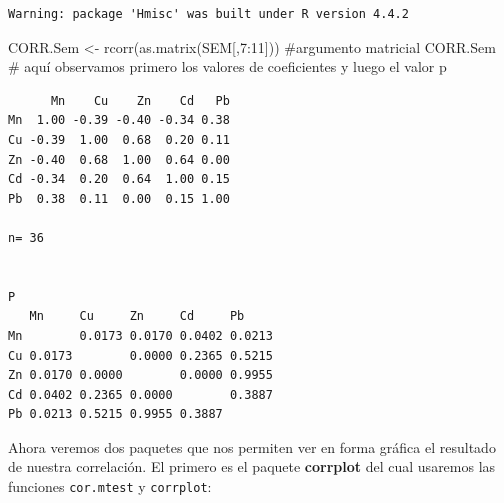 \documentclass[
  letterpaper,
  DIV=11,
  numbers=noendperiod]{scrartcl}
\newenvironment{Shaded}{\begin{snugshade}}{\end{snugshade}}
\newcommand{\AttributeTok}[1]{\textcolor[rgb]{0.40,0.45,0.13}{#1}}
\newcommand{\CommentTok}[1]{\textcolor[rgb]{0.37,0.37,0.37}{#1}}
\newcommand{\DecValTok}[1]{\textcolor[rgb]{0.68,0.00,0.00}{#1}}
\newcommand{\FloatTok}[1]{\textcolor[rgb]{0.68,0.00,0.00}{#1}}
\newcommand{\FunctionTok}[1]{\textcolor[rgb]{0.28,0.35,0.67}{#1}}
\newcommand{\NormalTok}[1]{\textcolor[rgb]{0.00,0.23,0.31}{#1}}
\newcommand{\OtherTok}[1]{\textcolor[rgb]{0.00,0.23,0.31}{#1}}
\newcommand{\SpecialCharTok}[1]{\textcolor[rgb]{0.37,0.37,0.37}{#1}}
\newcommand{\StringTok}[1]{\textcolor[rgb]{0.13,0.47,0.30}{#1}}
\begin{document}
\begin{verbatim}
Warning: package 'Hmisc' was built under R version 4.4.2
\end{verbatim}

\begin{Shaded}
\begin{Highlighting}[]
\NormalTok{CORR.Sem }\OtherTok{\textless{}{-}} \FunctionTok{rcorr}\NormalTok{(}\FunctionTok{as.matrix}\NormalTok{(SEM[,}\DecValTok{7}\SpecialCharTok{:}\DecValTok{11}\NormalTok{])) }\CommentTok{\#argumento matricial}
\NormalTok{CORR.Sem }\CommentTok{\# aquí observamos primero los valores de coeficientes y luego el valor p}
\end{Highlighting}
\end{Shaded}

\begin{verbatim}
      Mn    Cu    Zn    Cd   Pb
Mn  1.00 -0.39 -0.40 -0.34 0.38
Cu -0.39  1.00  0.68  0.20 0.11
Zn -0.40  0.68  1.00  0.64 0.00
Cd -0.34  0.20  0.64  1.00 0.15
Pb  0.38  0.11  0.00  0.15 1.00

n= 36 


P
   Mn     Cu     Zn     Cd     Pb    
Mn        0.0173 0.0170 0.0402 0.0213
Cu 0.0173        0.0000 0.2365 0.5215
Zn 0.0170 0.0000        0.0000 0.9955
Cd 0.0402 0.2365 0.0000        0.3887
Pb 0.0213 0.5215 0.9955 0.3887       
\end{verbatim}

Ahora veremos dos paquetes que nos permiten ver en forma gráfica el
resultado de nuestra correlación. El primero es el paquete
\textbf{corrplot} del cual usaremos las funciones \texttt{cor.mtest} y
\texttt{corrplot}:

\begin{Shaded}
\end{Shaded}
\end{document}
